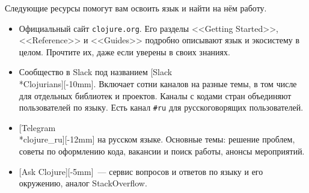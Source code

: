 Следующие ресурсы помогут вам освоить язык и найти на нём работу.

\begin{itemize}

\item
  Официальный сайт {\texttt{clojure.org}}. Его разделы <<Getting Started>>,
  <<Reference>> и <<Guides>> подробно описывают язык и экосистему в
  целом. Прочтите их, даже если уверены в своих знаниях.

\item
  Сообщество в Slack под названием
  [Slack\\*Clo\-ju\-ri\-ans][-10mm].
  Включает сотни каналов на разные темы, в том числе для отдельных библиотек и
  проектов. Каналы с кодами стран объединяют пользователей по языку. Есть канал
  \verb|#ru| для русскоговорящих пользователей.

\item
  [Telegram\\*cloju\-re\_ru][-12mm]
  на русском языке. Основные темы: решение проблем, советы по
  оформлению кода, вакансии и поиск работы, анонсы мероприятий.

\item
  [Ask Clojure][-5mm]~---
  сервис вопросов и ответов по языку и его окружению, аналог
  StackOverflow.

\end{itemize}
